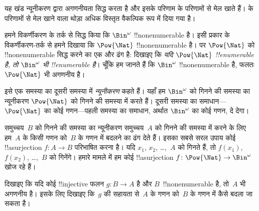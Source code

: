 \documentclass[../../../include/open-logic-section]{subfiles}
\begin{document}


\begin{editorial}
  यह खंड न्यूनीकरण द्वारा अगणनीयता सिद्ध करता है और इसके परिणाम
   के परिणामों से मेल खाते हैं।  के
  परिणामों से मेल खाने वाला थोड़ा अधिक विस्तृत वैकल्पिक रूप
   में दिया गया है।
\end{editorial}

हमने विकर्णीकरण के तर्क से सिद्ध किया कि $\Bin^\omega$ !!{nonenumerable}
है। इसी प्रकार के विकर्णीकरण-तर्क से हमने दिखाया कि $\Pow{\Nat}$
!!{nonenumerable} है। पर $\Pow{\Nat}$ को !!{nonenumerable} सिद्ध करने का
एक और ढंग है: दिखाइए कि \emph{यदि $\Pow{\Nat}$ !!{enumerable} है, तो
$\Bin^\omega$ भी !!{enumerable} है}। चूँकि हम जानते हैं कि $\Bin^\omega$
!!{nonenumerable} है, फलतः $\Pow{\Nat}$ भी अगणनीय है।

इसे एक समस्या का दूसरी समस्या में \emph{न्यूनीकरण} कहते हैं। यहाँ हम
$\Bin^\omega$ को गिनने की समस्या का न्यूनीकरण $\Pow{\Nat}$ को गिनने की
समस्या में करते हैं। दूसरी समस्या का समाधान---$\Pow{\Nat}$ का कोई
गणन---पहली समस्या का समाधान, अर्थात $\Bin^\omega$ का कोई गणन, दे देगा।

समुच्चय~$B$ को गिनने की समस्या का न्यूनीकरण समुच्चय~$A$ को गिनने की समस्या
में करने के लिए हम~$A$ के किसी गणन को~$B$ के गणन में बदलने का ढंग देते हैं।
इसका सबसे सरल उपाय कोई !!a{surjection} $f\colon A \to B$ परिभाषित करना है।
यदि $x_1$, $x_2$, \dots{},~$A$ को गिनते हैं, तो $f(x_1)$, $f(x_2)$,
\dots{},~$B$ को गिनेंगे। हमारे मामले में हम कोई !!a{surjection}
$f\colon \Pow{\Nat}
\to \Bin^\omega$ खोज रहे हैं।

\begin{prob}
दिखाइए कि यदि कोई !!{injective} फलन $g\colon B \to A$ है और
$B$~!!{nonenumerable} है, तो~$A$ भी अगणनीय है। इसके लिए दिखाइए कि~$g$ की
सहायता से~$A$ के गणन को~$B$ के गणन में कैसे बदला जा सकता है।
\end{prob}
\end{document}
